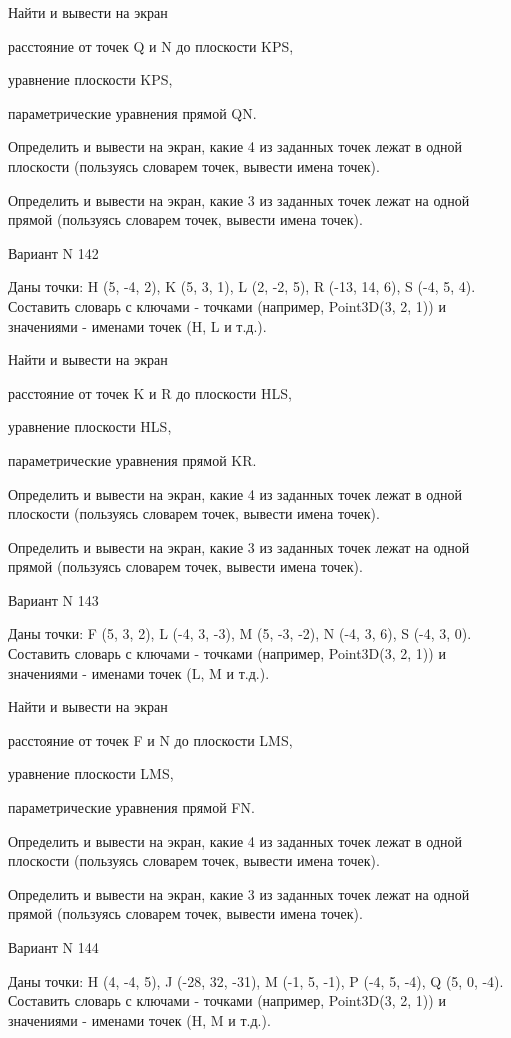 \documentclass[11pt]{report}
\begin{document}
 
Найти и вывести на экран


расстояние от точек Q и N до плоскости KPS,

 
уравнение плоскости KPS,

 
параметрические уравнения прямой QN.


Определить и вывести на экран, какие 4 из заданных точек лежат в одной плоскости (пользуясь словарем точек, вывести имена точек).


Определить и вывести на экран, какие 3 из заданных точек лежат на одной прямой (пользуясь словарем точек, вывести имена точек).

Вариант N 142

Даны точки: H (5, -4, 2), K (5, 3, 1), L (2, -2, 5), R (-13, 14, 6), S (-4, 5, 4).
Составить словарь с ключами - точками (например, Point3D(3, 2, 1)) и значениями - именами точек (H, L и т.д.).

 
Найти и вывести на экран


расстояние от точек K и R до плоскости HLS,

 
уравнение плоскости HLS,

 
параметрические уравнения прямой KR.


Определить и вывести на экран, какие 4 из заданных точек лежат в одной плоскости (пользуясь словарем точек, вывести имена точек).


Определить и вывести на экран, какие 3 из заданных точек лежат на одной прямой (пользуясь словарем точек, вывести имена точек).

Вариант N 143

Даны точки: F (5, 3, 2), L (-4, 3, -3), M (5, -3, -2), N (-4, 3, 6), S (-4, 3, 0).
Составить словарь с ключами - точками (например, Point3D(3, 2, 1)) и значениями - именами точек (L, M и т.д.).

 
Найти и вывести на экран


расстояние от точек F и N до плоскости LMS,

 
уравнение плоскости LMS,

 
параметрические уравнения прямой FN.


Определить и вывести на экран, какие 4 из заданных точек лежат в одной плоскости (пользуясь словарем точек, вывести имена точек).


Определить и вывести на экран, какие 3 из заданных точек лежат на одной прямой (пользуясь словарем точек, вывести имена точек).

Вариант N 144

Даны точки: H (4, -4, 5), J (-28, 32, -31), M (-1, 5, -1), P (-4, 5, -4), Q (5, 0, -4).
Составить словарь с ключами - точками (например, Point3D(3, 2, 1)) и значениями - именами точек (H, M и т.д.).
\end{document}
